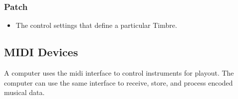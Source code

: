 \subsubsection*{Patch}
	\begin{itemize}
		\item The control settings that define a particular Timbre.
	\end{itemize}



\subsection[Devices]{MIDI Devices}

%

A computer uses the \gls{midi} interface to control instruments for playout. The computer can use the same interface to receive, store, and process encoded musical data. 

